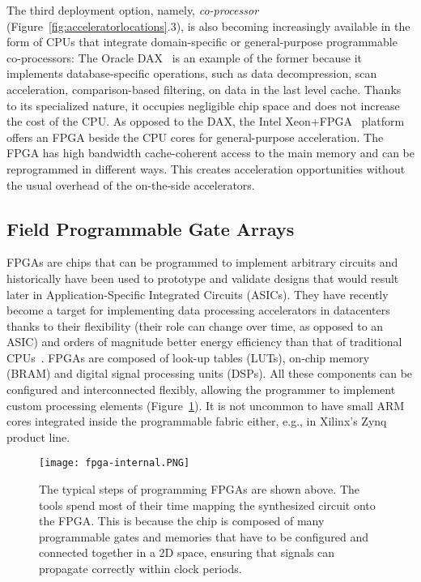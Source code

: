 \documentclass[11pt]{article}
\begin{document}
The third deployment option, namely, \emph{co-processor} (Figure~\ref{fig:acceleratorlocations}.3), is also becoming increasingly available in the form of CPUs that integrate domain-specific or general-purpose programmable co-processors: The Oracle DAX~\cite{aingaran-dax-hcs16} is an example of the former because it implements database-specific operations, such as data decompression, scan acceleration, comparison-based filtering, on data in the last level cache. Thanks to its specialized nature, it occupies negligible chip space and does not increase the cost of the CPU. As opposed to the DAX, the Intel Xeon+FPGA~\cite{gupta-harp-fpl16} platform offers an FPGA beside the CPU cores for general-purpose acceleration. The FPGA has high bandwidth cache-coherent access to the main memory and can be reprogrammed in different ways. This creates acceleration opportunities without the usual overhead of the on-the-side accelerators.


\subsection{Field Programmable Gate Arrays}

FPGAs are chips that can be programmed to implement arbitrary circuits and historically have been used to prototype and validate designs that would result later in Application-Specific Integrated Circuits (ASICs). They have recently become a target for implementing data processing accelerators in datacenters thanks to their flexibility (their role can change over time, as opposed to an ASIC) and orders of magnitude better energy efficiency than that of traditional CPUs~\cite{teubner-fpgabook-2011}. FPGAs are composed of look-up tables (LUTs), on-chip memory (BRAM) and digital signal processing units (DSPs). All these components can be configured and interconnected flexibly, allowing the programmer to implement custom processing elements (Figure~\ref{fig:insidefpga}). It is not uncommon to have small ARM cores integrated inside the programmable fabric either, e.g., in Xilinx's Zynq product line. 


\begin{figure}[h]
\centering
\texttt{[image: fpga-internal.PNG]}
\vspace{-1em}
\caption{The typical steps of programming FPGAs are shown above. The tools spend most of their time mapping the synthesized circuit onto the FPGA. This is because the chip is composed of many programmable gates and memories that have to be configured and connected together in a 2D space, ensuring that signals can propagate correctly within clock periods.\label{fig:insidefpga}}
\end{figure}
\end{document}
